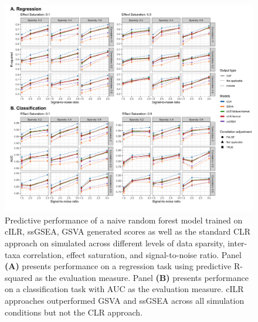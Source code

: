 \documentclass[10pt,letterpaper]{article}
\begin{document}
\begin{figure}[!h]
    \centering
    \includegraphics[width = \linewidth]{figures/sim_pred_combined.png}
    \caption{Predictive performance of a naive random forest model trained on cILR, ssGSEA, GSVA generated scores as well as the standard CLR approach on simulated across different levels of data sparsity, inter-taxa correlation, effect saturation, and signal-to-noise ratio. Panel \textbf{(A)} presents performance on a regression task using predictive R-squared as the evaluation measure. Panel \textbf{(B)} presents performance on a classification task with AUC as the evaluation measure. cILR approaches outperformed GSVA and ssGSEA across all simulation conditions but not the CLR approach.}
    \label{fig:6}
\end{figure}


\end{document}
